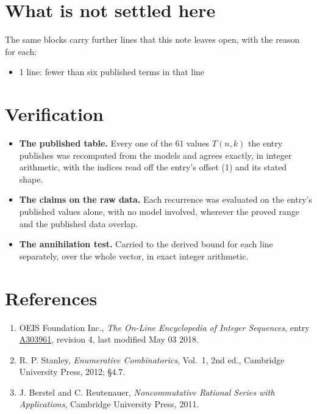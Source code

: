 \documentclass[11pt]{article}
\theoremstyle{definition}
\begin{document}
\section{What is not settled here}

The same blocks carry further lines that this note leaves open, with the reason for each:

\begin{itemize}

\item 1 line: fewer than six published terms in that line

\end{itemize}

\section{Verification}

\begin{itemize}

\item {\bfseries The published table.} Every one of the 61 values $T(n,k)$ the entry publishes was recomputed from the models and agrees exactly, in integer arithmetic, with the indices read off the entry's offset (1) and its stated shape.

\item {\bfseries The claims on the raw data.} Each recurrence was evaluated on the entry's published values alone, with no model involved, wherever the proved range and the published data overlap.

\item {\bfseries The annihilation test.} Carried to the derived bound for each line separately, over the whole vector, in exact integer arithmetic.

\end{itemize}

\section{References}

\begin{enumerate}

\item OEIS Foundation Inc., \emph{The On-Line Encyclopedia of Integer Sequences}, entry \href{https://oeis.org/A303961}{A303961}, revision 4, last modified May 03 2018.

\item R. P. Stanley, \emph{Enumerative Combinatorics}, Vol.~1, 2nd ed., Cambridge University Press, 2012; \S4.7.

\item J. Berstel and C. Reutenauer, \emph{Noncommutative Rational Series with Applications}, Cambridge University Press, 2011.

\end{enumerate}
\end{document}
